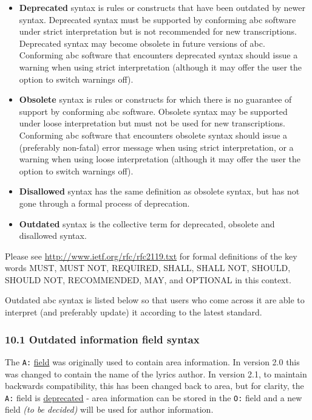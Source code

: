 \documentclass[oneside]{book}
\begin{document}
\begin{itemize}
\item
  \textbf{Deprecated} syntax is rules or constructs that have been
  outdated by newer syntax. Deprecated syntax must be supported by
  conforming abc software under strict interpretation but is not
  recommended for new transcriptions. Deprecated syntax may become
  obsolete in future versions of abc. Conforming abc software that
  encounters deprecated syntax should issue a warning when using strict
  interpretation (although it may offer the user the option to switch
  warnings off).
\item
  \textbf{Obsolete} syntax is rules or constructs for which there is no
  guarantee of support by conforming abc software. Obsolete syntax may
  be supported under loose interpretation but must not be used for new
  transcriptions. Conforming abc software that encounters obsolete
  syntax should issue a (preferably non-fatal) error message when using
  strict interpretation, or a warning when using loose interpretation
  (although it may offer the user the option to switch warnings off).
\item
  \textbf{Disallowed} syntax has the same definition as obsolete syntax,
  but has not gone through a formal process of deprecation.
\item
  \textbf{Outdated} syntax is the collective term for deprecated,
  obsolete and disallowed syntax.
\end{itemize}

Please see \url{http://www.ietf.org/rfc/rfc2119.txt} for formal
definitions of the key words MUST, MUST NOT, REQUIRED, SHALL, SHALL NOT,
SHOULD, SHOULD NOT, RECOMMENDED, MAY, and OPTIONAL in this context.

Outdated abc syntax is listed below so that users who come across it are
able to interpret (and preferably update) it according to the latest
standard.

\hypertarget{outdated_information_field_syntax}{\subsubsection{10.1
Outdated information field
syntax}\label{outdated_information_field_syntax}}

The \texttt{A:} \protect\hyperlink{aarea}{field} was originally used to
contain area information. In version 2.0 this was changed to contain the
name of the lyrics author. In version 2.1, to maintain backwards
compatibility, this has been changed back to area, but for clarity, the
\texttt{A:} field is \protect\hyperlink{outdated_syntax}{deprecated} -
area information can be stored in the \texttt{O:} field and a new field
\emph{(to be decided)} will be used for author information.
\end{document}
